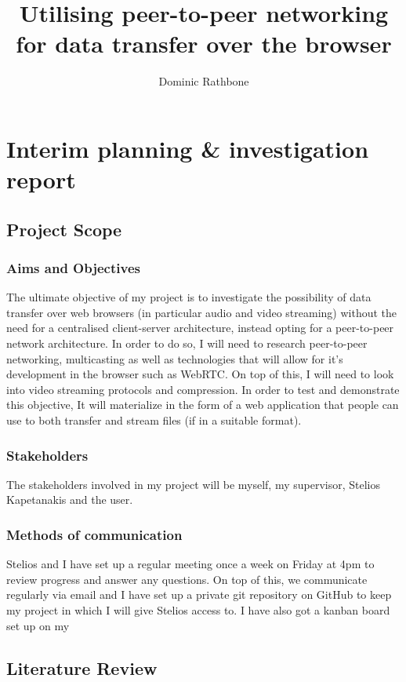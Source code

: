 \documentclass[]{report}
\title{Utilising peer-to-peer networking for data transfer over the browser}
\author{Dominic Rathbone}
\begin{document}
\maketitle
\tableofcontents
\listoftodos


\chapter{Interim planning \& investigation report}
	\section{Project Scope}
		\subsection*{Aims and Objectives}
			The ultimate objective of my project is to investigate the possibility of data transfer over web browsers (in particular audio and video streaming) without the need for a centralised client-server architecture, instead opting for a peer-to-peer network architecture. In order to do so, I will need to research peer-to-peer networking, multicasting as well as technologies that will allow for it's development in the browser such as WebRTC. On top of this, I will need to look into video streaming protocols and compression. In order to test and demonstrate this objective, It will materialize in the form of a web application that people can use to both transfer and stream files (if in a suitable format).
		\subsection*{Stakeholders}
			The stakeholders involved in my project will be myself, my supervisor, Stelios Kapetanakis and the user.
		\subsection*{Methods of communication}
			Stelios and I have set up a regular meeting once a week on Friday at 4pm to review progress and answer any questions. On top of this, we communicate regularly via email and I have set up a private git repository on GitHub to keep my project in which I will give Stelios access to. I have also got a kanban board set up on my 
			
	\section{Literature Review}
\end{document}
